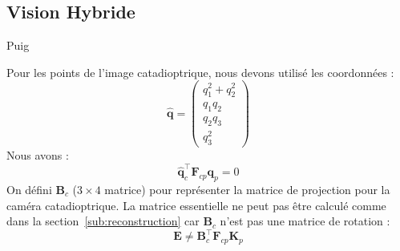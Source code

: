 \subsection{Vision Hybride}
Puig \cite{Puig08}

Pour les points de l'image catadioptrique, nous devons utilisé les coordonnées \cite{lifted}:
$$\hat{\mathbf{q}}=\begin{pmatrix}q_1^2+q_2^2\\q_1q_2\\q_2q_3\\q_3^2\end{pmatrix}$$
Nous avons :
\begin{equation}
\hat{\mathbf{q}}_c^{\top}\mathbf{F}_{cp}\mathbf{q}_p=0
\end{equation}
On défini $\mathbf{B}_c$ ($3\times4$ matrice) pour représenter la matrice de projection pour la caméra catadioptrique.
La matrice essentielle ne peut pas \^etre calculé comme dans la section~\ref{sub:reconstruction} car $\mathbf{B}_c$ n'est pas une matrice de rotation :
\begin{equation}
\mathbf{E} \neq \mathbf{B}_c^{\top} \mathbf{F}_{cp} \mathbf{K}_p
\end{equation}
